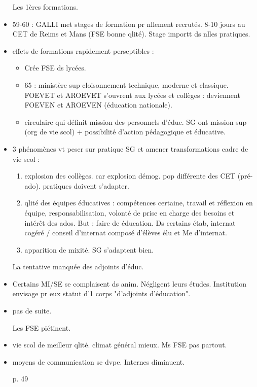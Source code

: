 \documentclass[12pt]{article}
\begin{document}
\begin{itemize}
Les 1ères formations.
\item 59-60 : GALLI met stages de formation pr nllement recrutés. 8-10 jours au CET de Reims et Mans (FSE bonne qlité). Stage importt ds nlles pratiques.
\item effets de formations rapidement perseptibles : 
\begin{itemize}
\item Crée FSE ds lycées.
\item 65 : ministère sup cloisonnement technique, moderne et classique. FOEVET et AROEVET s'ouvrent aux lycées et collèges : deviennent FOEVEN et AROEVEN (éducation nationale).
\item circulaire qui définit mission des personnels d'éduc. SG ont mission sup (org de vie scol) + possibilité d'action pédagogique et éducative.
\end{itemize}

\item 3 phénomènes vt peser sur pratique SG et amener transformations cadre de vie scol : 
\begin{enumerate}
\item explosion des collèges. car explosion démog. pop différente des CET (pré-ado). pratiques doivent s'adapter.
\item qlité des équipes éducatives : compétences certaine, travail et réflexion en équipe, responsabilisation, volonté de prise en charge des besoins et intérêt des ados. But : faire de éducation. Ds certains étab, internat cogéré / conseil d'internat composé d'élèves élu et Me d'internat.
\item apparition de mixité. SG s'adaptent bien.
\end{enumerate}

La tentative manquée des adjoints d'éduc.
\item Certains MI/SE se complaisent ds anim. Négligent leurs études. Institution envisage pr eux statut d'1 corps "d'adjoints d'éducation".
\item pas de suite.

Les FSE piétinent.
\item vie scol de meilleur qlité. climat général mieux. Ms FSE pas partout.
\item moyens de communication se dvpe. Internes diminuent.

p. 49

\end{itemize}
\end{document}
